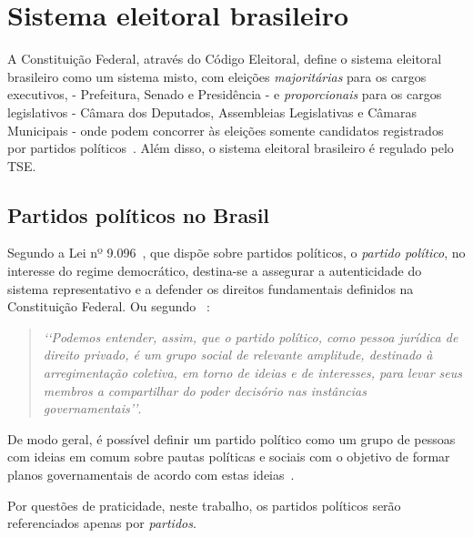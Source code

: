 
\section{Sistema eleitoral brasileiro}

A Constituição Federal, através do Código Eleitoral, define o sistema eleitoral brasileiro como um sistema misto, com eleições \emph{majoritárias} para os cargos executivos, - Prefeitura, Senado e Presidência - e \emph{proporcionais} para os cargos legislativos - Câmara dos Deputados, Assembleias Legislativas e Câmaras Municipais - onde podem concorrer às eleições somente candidatos registrados por partidos políticos~\cite{brasil1965lei4737}. Além disso, o sistema eleitoral brasileiro é regulado pelo \gls{TSE}.

\subsection{Partidos políticos no Brasil}
\label{conceitos__partidos-brasil}
    
Segundo a  Lei nº 9.096~\cite{brasil1995lei9096}, que dispõe sobre partidos políticos, o \emph{partido político}, no interesse do regime democrático, destina-se a assegurar a autenticidade do sistema representativo e a defender os direitos fundamentais definidos na Constituição Federal. Ou segundo ~\cite{michels2006direito}:

\begin{quotation}
    \emph{‘‘Podemos entender, assim, que o partido político, como pessoa jurídica de direito privado, é um grupo social de relevante amplitude, destinado à arregimentação coletiva, em torno de ideias e de interesses, para levar seus membros a compartilhar do poder decisório nas instâncias governamentais’’}.
\end{quotation}

De modo geral, é possível definir um partido político como um grupo de pessoas com ideias em comum sobre pautas políticas e sociais com o objetivo de formar planos governamentais de acordo com estas ideias~\cite{garibaldi2017partidos}.

Por questões de praticidade, neste trabalho, os partidos políticos serão referenciados apenas por \emph{partidos}. 

